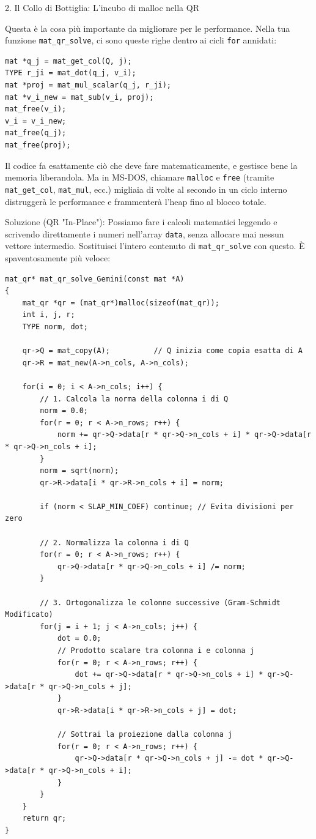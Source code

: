 \documentclass[10pt]{article}
\begin{document}
\dotfill

2. Il Collo di Bottiglia: L'incubo di malloc nella QR

Questa è la cosa più importante da migliorare per le performance.
Nella tua funzione \texttt{mat\_qr\_solve}, ci sono queste righe dentro ai cicli \texttt{for} annidati:

\begin{lstlisting}
mat *q_j = mat_get_col(Q, j);
TYPE r_ji = mat_dot(q_j, v_i);
mat *proj = mat_mul_scalar(q_j, r_ji);
mat *v_i_new = mat_sub(v_i, proj);
mat_free(v_i);
v_i = v_i_new;
mat_free(q_j);
mat_free(proj);
\end{lstlisting}

Il codice fa esattamente ciò che deve fare matematicamente, e gestisce bene la memoria liberandola. Ma in MS-DOS, chiamare \texttt{malloc} e \texttt{free} (tramite \texttt{mat\_get\_col}, \texttt{mat\_mul}, ecc.) migliaia di volte al secondo in un ciclo interno distruggerà le performance e frammenterà l'heap fino al blocco totale.

Soluzione (QR "In-Place"):
Possiamo fare i calcoli matematici leggendo e scrivendo direttamente i numeri nell'array \texttt{data}, senza allocare mai nessun vettore intermedio. Sostituisci l'intero contenuto di \texttt{mat\_qr\_solve} con questo. È spaventosamente più veloce:

\begin{lstlisting}
mat_qr* mat_qr_solve_Gemini(const mat *A)
{
	mat_qr *qr = (mat_qr*)malloc(sizeof(mat_qr));
	int i, j, r;
	TYPE norm, dot;

	qr->Q = mat_copy(A);          // Q inizia come copia esatta di A
	qr->R = mat_new(A->n_cols, A->n_cols); 

	for(i = 0; i < A->n_cols; i++) {
		// 1. Calcola la norma della colonna i di Q
		norm = 0.0;
		for(r = 0; r < A->n_rows; r++) {
			norm += qr->Q->data[r * qr->Q->n_cols + i] * qr->Q->data[r * qr->Q->n_cols + i];
		}
		norm = sqrt(norm);
		qr->R->data[i * qr->R->n_cols + i] = norm;

		if (norm < SLAP_MIN_COEF) continue; // Evita divisioni per zero

		// 2. Normalizza la colonna i di Q
		for(r = 0; r < A->n_rows; r++) {
			qr->Q->data[r * qr->Q->n_cols + i] /= norm;
		}

		// 3. Ortogonalizza le colonne successive (Gram-Schmidt Modificato)
		for(j = i + 1; j < A->n_cols; j++) {
			dot = 0.0;
			// Prodotto scalare tra colonna i e colonna j
			for(r = 0; r < A->n_rows; r++) {
				dot += qr->Q->data[r * qr->Q->n_cols + i] * qr->Q->data[r * qr->Q->n_cols + j];
			}
			qr->R->data[i * qr->R->n_cols + j] = dot;

			// Sottrai la proiezione dalla colonna j
			for(r = 0; r < A->n_rows; r++) {
				qr->Q->data[r * qr->Q->n_cols + j] -= dot * qr->Q->data[r * qr->Q->n_cols + i];
			}
		}
	}
	return qr;
}
\end{lstlisting}
\end{document}
